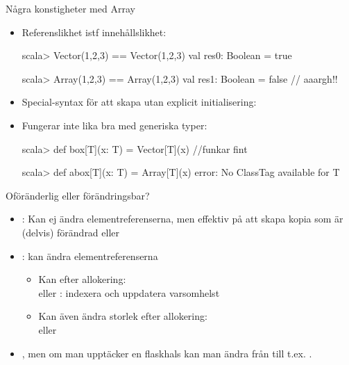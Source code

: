\begin{Slide}{Några konstigheter med Array}
\begin{itemize}
\item Referenslikhet istf innehållslikhet: 
\begin{REPLnonum}
scala> Vector(1,2,3) == Vector(1,2,3)
val res0: Boolean = true

scala> Array(1,2,3) == Array(1,2,3)
val res1: Boolean = false  // aaargh!!
\end{REPLnonum}
\item Special-syntax för att skapa utan explicit initialisering: \\
{\SlideFontSmall{}}
\item Fungerar inte lika bra med generiska typer:
\begin{REPLnonum}
scala> def box[T](x: T) = Vector[T](x)  //funkar fint

scala> def abox[T](x: T) = Array[T](x)
  error: No ClassTag available for T
\end{REPLnonum}
\end{itemize}
\end{Slide}

\begin{Slide}{Oföränderlig eller förändringsbar?}
\begin{itemize}
\item {}:  Kan ej ändra elementreferenserna, men effektiv på att skapa kopia som är (delvis) förändrad  eller 

\item {}: kan ändra elementreferenserna
  \begin{itemize}
  \item Kan  efter allokering: \\  eller : indexera och uppdatera varsomhelst
  \item Kan även ändra storlek efter allokering:
  \\ eller 
  \end{itemize}
\item {}, men om man  upptäcker en flaskhals kan man ändra från  till t.ex. .
\end{itemize}
\end{Slide}



